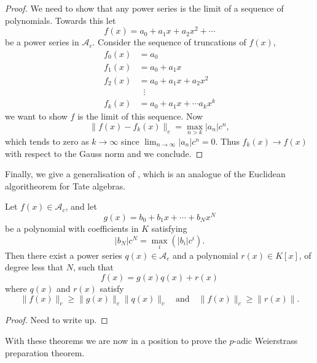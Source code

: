 \begin{proof}
    We need to show that any power series is the limit of a sequence of polynomials. Towards this
    let
    \[
    f(x) = a_0 + a_1x+a_2x^2 + \cdots
    \]
    be a power series in $\mathcal{A}_c$.
    Consider the sequence of truncations of $f(x)$,
    \begin{align*}
        f_0(x) &= a_0 \\
        f_1(x) &= a_0 + a_1 x \\
        f_2(x) &= a_0 + a_1 x + a_2 x^2 \\
        & \; \; \vdots \\
        f_k(x) &= a_0 + a_1 x + \cdots a_k x^k
    \end{align*}
    we want to show $f$ is the limit of this sequence. Now
    \[
    \| f(x) - f_k (x) \|_c = \max_{n>k} |a_n|c^n,
    \]
    which tends to zero as $k \to \infty$ since $\lim_{n \to \infty} |a_n|c^n = 0$. Thus
    $f_k (x) \to f(x)$ with respect to the Gauss norm and we conclude.
\end{proof}

Finally, we give a generalisation of \cite[Lemma~7.2.9]{Gouvea}, which is an analogue of the
Euclidean algoritheorem for Tate algebras.

\begin{lemma} \label{euclidalgoritheorem}
    Let $f(x) \in \mathcal{A}_c$, and let
    \[
    g(x) = b_0 + b_1 x + \cdots + b_N x^N
    \]
    be a polynomial with coefficients in $K$ satisfying
    \[
    \lvert b_N \rvert  c^N= \max_i (\lvert b_i \rvert c^i).
    \]
    Then there exist a power series $q(x) \in \mathcal{A}_c$ and a polynomial $r(x) \in K[x]$,
    of degree less that $N$, such that
    \[
    f(x) = g(x) q(x) + r(x)
    \]
    where $q(x)$ and $r(x)$ satisfy
    \[
    \|f(x) \|_c \geq \|g(x)\|_c \| q(x)\|_c \quad \text{and} \quad \|f(x) \|_c \geq \| r(x) \|.
    \]
    \end{lemma}

\begin{proof}
    Need to write up.
\end{proof}

With these theorems we are now in a position to prove the $p$-adic Weierstrass preparation theorem.

